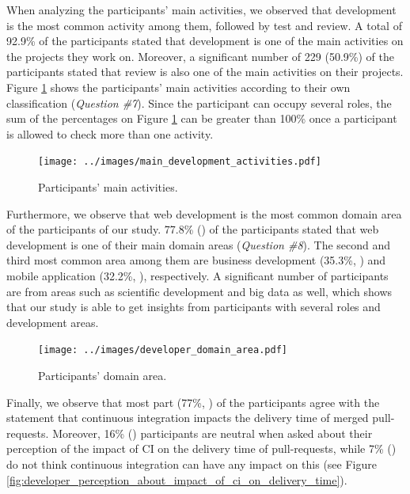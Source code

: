 	When analyzing the participants' main activities, we observed that development is the most common activity among them, followed by test and review. A total of 92.9\% of the participants stated that development is one of the main activities on the projects they work on. Moreover, a significant 
	number of 229 (50.9\%) of the participants stated that review is also one of the main activities on their projects. Figure \ref{fig:main_development_activities} shows the participants' main activities according to their own classification (\textit{Question \#7}). Since the participant can occupy several roles, the sum of the percentages on Figure \ref{fig:main_development_activities} can be greater than 100\% once a participant is allowed to check more than one activity.

	\begin{figure}[H]
	\texttt{[image: ../images/main\_development\_activities.pdf]}
	\caption{Participants' main activities.}
	\label{fig:main_development_activities}       %
	\end{figure}

	Furthermore, we observe that web development is the most common domain area of the participants of our study. 77.8\% () of the participants stated that web development is one of their main domain areas (\textit{Question \#8}). The second and third most common area among them are business development (35.3\%, ) and mobile application (32.2\%, ), respectively. A significant number of participants are from areas such as scientific development and big data as well, which shows that our study is able to get insights from participants with several roles and development areas.

	\begin{figure}[H]
	\texttt{[image: ../images/developer\_domain\_area.pdf]}
	\caption{Participants' domain area.}
	\label{fig:developer_domain_area}       %
	\end{figure}

	Finally, we observe that most part (77\%, ) of the participants agree with the statement that continuous integration impacts the delivery time of merged pull-requests. Moreover, 16\% () participants are neutral when asked about their perception of the impact of CI on the delivery time of pull-requests, while 7\% () do not think continuous integration can have any impact on this (see Figure \ref{fig:developer_perception_about_impact_of_ci_on_delivery_time}).
	
